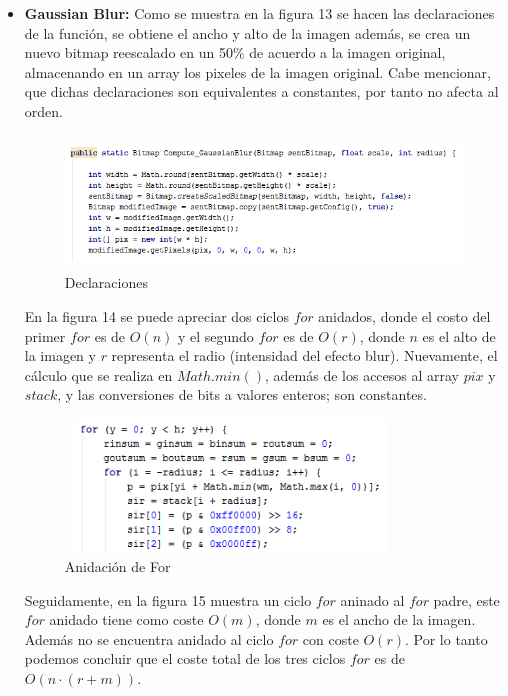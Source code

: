 \documentclass[journal]{IEEEtran}
\begin{document}
	
	

	\begin{itemize}
		\item{\bf Gaussian Blur:} Como se muestra en la figura 13 se hacen las declaraciones de la función, se obtiene el ancho y alto de la imagen además, se crea un nuevo bitmap reescalado en un 50\% de acuerdo a la imagen original, almacenando en un array los pixeles de la imagen original. Cabe mencionar, que dichas declaraciones son equivalentes a constantes, por tanto no afecta al orden.
		
		
		\begin{figure}[h]
			\centering
			\includegraphics[height= 100pt, width=300pt]{1.png}
			\caption{Declaraciones}
		\end{figure}		
		
		En la figura 14 se puede apreciar dos ciclos $for$ anidados, donde el costo del primer $for$ es de $O(n)$ y el segundo $for$ es de $O(r)$, donde $n$ es el alto de la imagen y $r$ representa el radio (intensidad del efecto blur). Nuevamente, el cálculo que se realiza en $Math.min()$, además de los accesos al array $pix$ y $stack$, y las conversiones de bits a valores enteros; son constantes.
	
		\begin{figure}[h]
			\centering
			\includegraphics[height= 100pt, width=250pt]{3.png}
			\caption{Anidación de For}
		\end{figure}
	
		Seguidamente, en la figura 15 muestra un ciclo $for$ aninado al $for$ padre, este $for$ anidado tiene como coste $O(m)$, donde $m$ es el ancho de la imagen. Además no se encuentra anidado al ciclo $for$ con coste $O(r)$.
		Por lo tanto podemos concluir que el coste total de los tres ciclos $for$ es de $O(n \cdot (r + m))$. 
	

\end{itemize}
\end{document}
